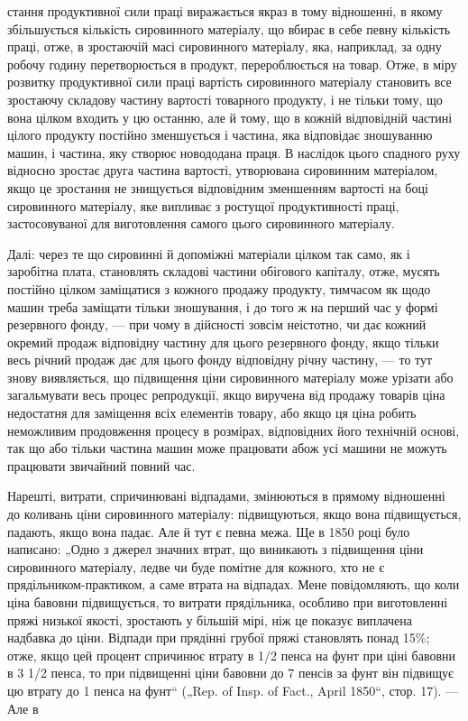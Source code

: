 стання продуктивної сили праці виражається якраз в тому відношенні,
в якому збільшується кількість сировинного матеріалу,
що вбирає в себе певну кількість праці, отже, в зростаючій масі
сировинного матеріалу, яка, наприклад, за одну робочу годину перетворюється
в продукт, перероблюється на товар. Отже, в
міру розвитку продуктивної сили праці вартість сировинного
матеріалу становить все зростаючу складову частину вартості
товарного продукту, і не тільки тому, що вона цілком входить
у цю останню, але й тому, що в кожній відповідній частині
цілого продукту постійно зменшується і частина, яка відповідає
зношуванню машин, і частина, яку створює новододана праця.
В наслідок цього спадного руху відносно зростає друга частина
вартості, утворювана сировинним матеріалом, якщо це зростання
не знищується відповідним зменшенням вартості на боці сировинного
матеріалу, яке випливає з ростущої продуктивності
праці, застосовуваної для виготовлення самого цього сировинного
матеріалу.

Далі: через те що сировинні й допоміжні матеріали цілком
так само, як і заробітна плата, становлять складові частини
обігового капіталу, отже, мусять постійно цілком заміщатися
з кожного продажу продукту, тимчасом як щодо машин треба
заміщати тільки зношування, і до того ж на перший час у формі
резервного фонду, — при чому в дійсності зовсім неістотно, чи
дає кожний окремий продаж відповідну частину для цього
резервного фонду, якщо тільки весь річний продаж дає для
цього фонду відповідну річну частину, — то тут знову виявляється,
що підвищення ціни сировинного матеріалу може урізати
або загальмувати весь процес репродукції, якщо виручена
від продажу товарів ціна недостатня для заміщення всіх елементів
товару, або якщо ця ціна робить неможливим продовження
процесу в розмірах, відповідних його технічній основі,
так що або тільки частина машин може працювати абож усі
машини не можуть працювати звичайний повний час.

Нарешті, витрати, спричинювані відпадами, змінюються в прямому
відношенні до коливань ціни сировинного матеріалу: підвищуються,
якщо вона підвищується, падають, якщо вона падає. Але
й тут є певна межа. Ще в 1850 році було написано: „Одно з джерел
значних втрат, що виникають з підвищення ціни сировинного
матеріалу, ледве чи буде помітне для кожного, хто не є
прядільником-практиком, а саме втрата на відпадах. Мене повідомляють,
що коли ціна бавовни підвищується, то витрати прядільника,
особливо при виготовленні пряжі низької якості, зростають
у більшій мірі, ніж це показує виплачена надбавка до
ціни. Відпади при прядінні грубої пряжі становлять понад 15\%;
отже, якщо цей процент спричинює втрату в 1/2 пенса на фунт
при ціні бавовни в 3 1/2 пенса, то при підвищенні ціни бавовни
до 7 пенсів за фунт він підвищує цю втрату до 1 пенса на
фунт“ („Rep. of Insp. of Fact., April 1850“, стор. 17). — Але в
